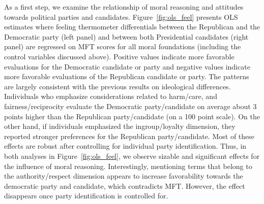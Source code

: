 \documentclass[12pt]{article}
\begin{document}
As a first step, we examine the relationship of moral reasoning and attitudes towards political parties and candidates. Figure~\ref{fig:ols_feel} presents OLS estimates where feeling thermometer differentials between the Republican and the Democratic party (left panel) and between both Presidential candidates (right panel) are regressed on MFT scores for all moral foundations (including the control variables discussed above). Positive values indicate more favorable evaluations for the Democratic candidate or party and negative values indicate more favorable evaluations of the Republican candidate or party. The patterns are largely consistent with the previous results on ideological differences. Individuals who emphasize considerations related to harm/care, and fairness/reciprocity evaluate the Democratic party/candidate on average about 3 points higher than the Republican party/candidate (on a 100 point scale). On the other hand, if individuals emphasized the ingroup/loyalty dimension, they reported stronger preferences for the Republican party/candidate. Most of these effects are robust after controlling for individual party identification. Thus, in both analyses in Figure~\ref{fig:ols_feel}, we observe sizable and significant effects for the influence of moral reasoning. Interestingly, mentioning terms that belong to the authority/respect dimension appears to increase favorability towards the democratic party and candidate, which contradicts MFT. However, the effect disappears once party identification is controlled for.
\end{document}
